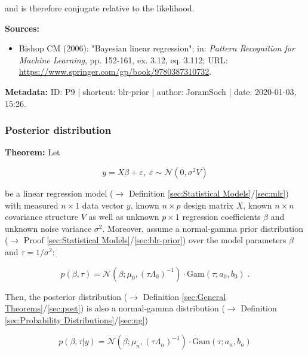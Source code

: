 \documentclass[a4paper,12pt,twoside]{book}
\begin{document}
and is therefore conjugate relative to the likelihood.


\vspace{1em}
\textbf{Sources:}
\begin{itemize}
\item Bishop CM (2006): "Bayesian linear regression"; in: \textit{Pattern Recognition for Machine Learning}, pp. 152-161, ex. 3.12, eq. 3.112; URL: \url{https://www.springer.com/gp/book/9780387310732}.
\end{itemize}


\vspace{1em}
\textbf{Metadata:} ID: P9 | shortcut: blr-prior | author: JoramSoch | date: 2020-01-03, 15:26.
\vspace{1em}



\subsubsection[\textbf{Posterior distribution}]{Posterior distribution} \label{sec:blr-post}
\setcounter{equation}{0}

\textbf{Theorem:} Let

\begin{equation} \label{eq:blr-post-GLM}
y = X \beta + \varepsilon, \; \varepsilon \sim \mathcal{N}(0, \sigma^2 V)
\end{equation}

be a linear regression model ($\rightarrow$ Definition \ref{sec:Statistical Models}/\ref{sec:mlr}) with measured $n \times 1$ data vector $y$, known $n \times p$ design matrix $X$, known $n \times n$ covariance structure $V$ as well as unknown $p \times 1$ regression coefficients $\beta$ and unknown noise variance $\sigma^2$. Moreover, assume a normal-gamma prior distribution ($\rightarrow$ Proof \ref{sec:Statistical Models}/\ref{sec:blr-prior}) over the model parameters $\beta$ and $\tau = 1/\sigma^2$:

\begin{equation} \label{eq:blr-post-GLM-NG-prior}
p(\beta,\tau) = \mathcal{N}(\beta; \mu_0, (\tau \Lambda_0)^{-1}) \cdot \mathrm{Gam}(\tau; a_0, b_0) \; .
\end{equation}

Then, the posterior distribution ($\rightarrow$ Definition \ref{sec:General Theorems}/\ref{sec:post}) is also a normal-gamma distribution ($\rightarrow$ Definition \ref{sec:Probability Distributions}/\ref{sec:ng})

\begin{equation} \label{eq:blr-post-GLM-NG-post}
p(\beta,\tau|y) = \mathcal{N}(\beta; \mu_n, (\tau \Lambda_n)^{-1}) \cdot \mathrm{Gam}(\tau; a_n, b_n)
\end{equation}
\end{document}
